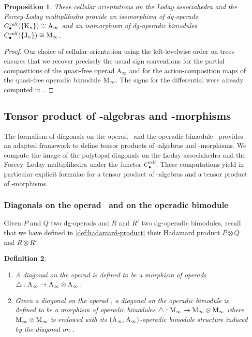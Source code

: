\documentclass[twoside, 12pt]{amsart}
\newtheorem{definition}{Definition}[section]
\newtheorem{proposition}[definition]{Proposition}
\theoremstyle{remark}
\begin{document}
\begin{proposition} 
\label{prop:functoriality}
These cellular orientations on the Loday associahedra and the Forcey-Loday multiplihedra provide an isomorphism of dg-operads $C_\bullet^{cell}(\{\mathrm{K}_n\})\cong \mathrm{A}_\infty$ and an isomorphism of dg-operadic bimodules $C_\bullet^{cell}(\{\mathrm{J}_n\})\cong \mathrm{M}_\infty$. 
\end{proposition}

\begin{proof}
Our choice of cellular orientation using the left-levelwise order on trees ensures that we recover precisely the usual sign conventions for the partial compositions of the quasi-free operad $\mathrm{A}_\infty$ and for the action-composition maps of the quasi-free operadic bimodule $\mathrm{M}_\infty$. 
The signs for the differential were already computed in \cite[I, Section 4]{Mazuir21}.
\end{proof}

\subsection{Tensor product of \Ainf -algebras and \Ainf -morphisms}

The formalism of diagonals on the operad \Ainf\ and the operadic bimodule \Minf\ provides an adapted framework to define tensor products of \Ainf -algebras and \Ainf -morphisms.
We compute the image of the polytopal diagonals on the Loday associahedra and the Forcey--Loday multiplihedra under the functor $C_\bullet^{cell}$. These computations yield in particular explicit formulae for a tensor product of \Ainf -algebras and a tensor product of \Ainf -morphisms.

\subsubsection{Diagonals on the operad \Ainf\ and on the operadic bimodule \Minf}

Given $P$ and $Q$ two dg-operads and $R$ and $R'$ two dg-operadic bimodules, recall that we have defined in \cref{def:hadamard-product} their Hadamard product $P \otimes Q$ and $R \otimes R'$.

\begin{definition}
\begin{enumerate}[leftmargin=*] $ $
    \item A \emph{diagonal on the operad \Ainf} is defined to be a morphism of operads $\triangle : \mathrm{A}_\infty \rightarrow \mathrm{A}_\infty \otimes \mathrm{A}_\infty$. 
    \item Given a diagonal on the operad \Ainf, a \emph{diagonal on the operadic bimodule \Minf} is defined to be a morphism of operadic bimodules $\triangle : \mathrm{M}_\infty \rightarrow \mathrm{M}_\infty \otimes \mathrm{M}_\infty$ where $\mathrm{M}_\infty \otimes \mathrm{M}_\infty$ is endowed with its $(\mathrm{A}_\infty , \mathrm{A}_\infty)$-operadic bimodule structure induced by the diagonal on \Ainf .
\end{enumerate}
\end{definition}
\end{document}
